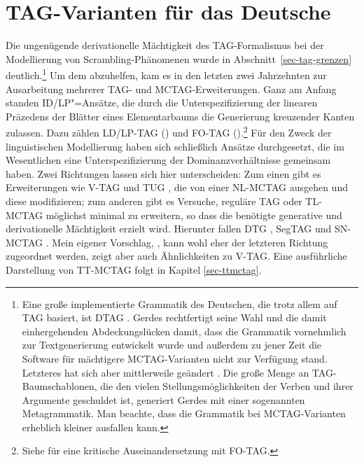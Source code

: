 \newpage
\section{TAG-Varianten für das Deutsche} \label{sec-tag-varianten}
\largerpage
Die ungenügende derivationelle Mächtigkeit des TAG-Formalismus bei der Modellierung von Scrambling-Phänomenen wurde in Abschnitt~\ref{sec-tag-grenzen} deutlich.\footnote{Eine große implementierte Grammatik des Deutschen, die trotz allem auf TAG basiert, ist DTAG \citep{Gerdes:02,Gerdes:02b}. Gerdes rechtfertigt seine Wahl und die damit einhergehenden Abdeckungslücken damit, dass die Grammatik vornehmlich zur Textgenerierung entwickelt wurde und außerdem zu jener Zeit die Software für mächtigere MCTAG-Varianten nicht zur Verfügung stand. Letzteres hat sich aber mittlerweile geändert \citep{Parmentier:etal:07,Kallmeyer:etal:08}. Die große Menge an TAG-Baumschablonen, die den vielen Stellungsmöglichkeiten der Verben und ihrer Argumente geschuldet ist, generiert Gerdes mit einer sogenannten Metagrammatik. Man beachte, dass die Grammatik bei MCTAG-Varianten erheblich kleiner ausfallen kann.} Um dem abzuhelfen, kam es in den letzten zwei Jahrzehnten zur Ausarbeitung mehrerer TAG- und MCTAG-Erweiterungen. Ganz am Anfang standen ID/LP"=Ansätze, die durch die Unterspezifizierung der linearen Präzedens der Blätter eines Elementarbaums die Generierung kreuzender Kanten zulassen. Dazu zählen LD/LP-TAG (\citealt{Joshi:87b, Joshi:etal:90}) und FO-TAG (\citealt{Becker:Joshi:Rambow:91, Becker:94}).\footnote{Siehe \citet[43ff]{Rambow:94} für eine kritische Auseinandersetzung mit FO-TAG.} Für den Zweck der linguistischen Modellierung haben sich schlie\ss lich Ansätze durchgesetzt, die im Wesentlichen eine Unterspezifizierung der Dominanzverhältnisse gemeinsam haben. Zwei Richtungen lassen sich hier unterscheiden: Zum einen gibt es Erweiterungen wie V-TAG \citep{Rambow:94} und TUG \citep{Gerdes:04}, die von einer NL-MCTAG ausgehen und diese modifizieren; zum anderen gibt es Versuche, reguläre TAG oder TL-MCTAG möglichst minimal zu erweitern, so dass die benötigte generative und derivationelle Mächtigkeit erzielt wird. Hierunter fallen DTG \citep{Rambow:etal:95}, SegTAG \citep{Kulick:00} und SN-MCTAG \citep{Kallmeyer:05}. Mein eigener Vorschlag, , kann wohl eher der letzteren  Richtung zugeordnet werden, zeigt aber auch Ähnlichkeiten zu V-TAG. Eine ausführliche Darstellung von TT-MCTAG folgt in Kapitel \ref{sec-ttmctag}. 


